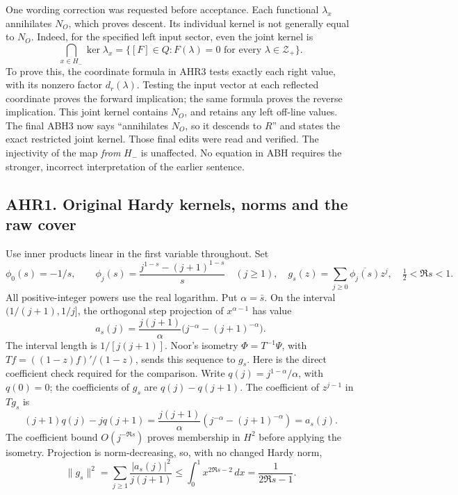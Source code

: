 One wording correction was requested before acceptance. Each functional
\(\lambda_x\) annihilates \(N_O\), which proves descent. Its individual
kernel is not generally equal to \(N_O\). Indeed, for the specified left
input sector, even the joint kernel is \[
\bigcap_{x\in H_-}\ker\lambda_x
=\{[F]\in Q:F(\lambda)=0\text{ for every }\lambda\in\mathscr Z_+\}.
\tag{AHR0.1}
\] To prove this, the coordinate formula in AHR3 tests exactly each
right value, with its nonzero factor \(d_r(\lambda)\). Testing the input
vector at each reflected coordinate proves the forward implication; the
same formula proves the reverse implication. This joint kernel contains
\(N_O\), and retains any left off-line values. The final ABH3 now says
``annihilates \(N_O\), so it descends to \(R\)'' and states the exact
restricted joint kernel. Those final edits were read and verified. The
injectivity of the map \emph{from} \(H_-\) is unaffected. No equation in
ABH requires the stronger, incorrect interpretation of the earlier
sentence.

\subsection{AHR1. Original Hardy kernels, norms and the raw
cover}\label{ahr1.-original-hardy-kernels-norms-and-the-raw-cover}

Use inner products linear in the first variable throughout. Set \[
\phi_0(s)=-1/s,\qquad
\phi_j(s)=\frac{j^{1-s}-(j+1)^{1-s}}s\quad(j\ge1),
\quad
g_s(z)=\sum_{j\ge0}\overline{\phi_j(s)}z^j,
\quad\tfrac12<\Re s<1.
\tag{AHR1.1}
\] All positive-integer powers use the real logarithm. Put
\(\alpha=\bar s\). On the interval \((1/(j+1),1/j]\), the orthogonal
step projection of \(x^{\alpha-1}\) has value \[
a_s(j)=\frac{j(j+1)}\alpha\bigl(j^{-\alpha}-(j+1)^{-\alpha}\bigr).
\] The interval length is \(1/[j(j+1)]\). Noor's isometry
\(\Phi=T^{-1}\Psi\), with \(Tf=((1-z)f)'/(1-z)\), sends this sequence to
\(g_s\). Here is the direct coefficient check required for the
comparison. Write \(q(j)=j^{1-\alpha}/\alpha\), with \(q(0)=0\); the
coefficients of \(g_s\) are \(q(j)-q(j+1)\). The coefficient of
\(z^{j-1}\) in \(Tg_s\) is \[
(j+1)q(j)-jq(j+1)
=\frac{j(j+1)}\alpha(j^{-\alpha}-(j+1)^{-\alpha})=a_s(j).
\] The coefficient bound \(O(j^{-\Re s})\) proves membership in \(H^2\)
before applying the isometry. Projection is norm-decreasing, so, with no
changed Hardy norm, \[
\|g_s\|^2=\sum_{j\ge1}\frac{|a_s(j)|^2}{j(j+1)}
\le\int_0^1x^{2\Re s-2}\,dx=\frac1{2\Re s-1}.
\tag{AHR1.2}
\]

